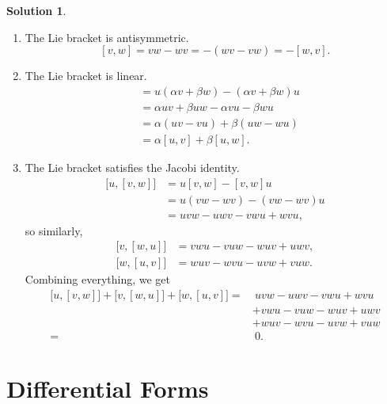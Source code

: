 \documentclass[11pt, a4paper]{report}
\theoremstyle{definition}
\newtheorem{solution}{Solution}[part]
\newenvironment{sol}{\begin{solution}}{\end{solution}\pagebreak[3]}
\begin{document}
\begin{sol}\label{sol:liebracketvectorfields}
\mbox{}

\begin{enumerate}

\item The Lie bracket is antisymmetric.
    \[
        [v, w] = vw - wv = -(wv - vw) = -[w, v].
    \]

\item The Lie bracket is linear.
    \begin{align*}
        [u, \alpha v + \beta w] &= u (\alpha v + \beta w) - (\alpha v + \beta w) u \\
            &= \alpha uv + \beta uw - \alpha vu - \beta wu \\
            &= \alpha(uv - vu) + \beta(uw - wu) \\
            &= \alpha [u, v] + \beta [u, w].
    \end{align*}

\item The Lie bracket satisfies the Jacobi identity.
    \begin{align*}
        \big[u, [v, w]\big] &= u[v, w] - [v, w]u \\
            &= u(vw - wv) - (vw - wv)u \\
            &= uvw - uwv - vwu + wvu,
    \end{align*}
    so similarly,
    \begin{align*}
        \big[v, [w, u]\big] &= vwu - vuw - wuv + uwv, \\
        \big[w, [u, v]\big] &= wuv - wvu - uvw + vuw.
    \end{align*}
    Combining everything, we get
    \begin{align*}
        \big[u, [v, w]\big] + \big[v, [w, u]\big] + \big[w, [u, v]\big] =&\ uvw - uwv - vwu + wvu \\
            &+ vwu - vuw - wuv + uwv \\
            &+ wuv - wvu - uvw + vuw \\
            =&\ 0.
    \end{align*}
\end{enumerate}

\end{sol}

\chapter{Differential Forms}
\end{document}
